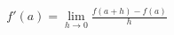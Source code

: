 \documentclass[preview]{standalone}
\begin{document}
\begin{align*}
f'(a) = \lim_{h \to 0} \frac{f(a+h)-f(a)}{h}
\end{align*}
\end{document}
